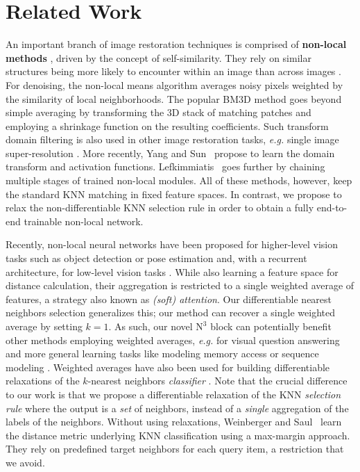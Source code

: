 \documentclass{article}
\makeatletter
\newcommand{\eg}{\emph{e.\thinspace{}g.}\@\xspace}
\newcommand\kk{k}
\newcommand\nnn{\text{N}^3}
\makeatother
\begin{document}
\section{Related Work}
An important branch of image restoration techniques is comprised of \textbf{non-local methods} \cite{Buades:2005:NLA,Dabov:2006:IDB,Lotan:2016:NMR,Zontak:2013:SSN}, driven by the concept of self-similarity.
They rely on similar structures being more likely to encounter within an image than across images \cite{Zontak:2011:ISS}.
For denoising, the non-local means algorithm \cite{Buades:2005:NLA} averages noisy pixels weighted by the similarity of
local neighborhoods.
The popular BM3D method \cite{Dabov:2006:IDB} goes beyond simple averaging by transforming the 3D stack of matching patches and employing a shrinkage function on the resulting coefficients. 
Such transform domain filtering is also used in other image restoration tasks, \eg single image super-resolution \cite{Cruz:2018:SIS}.
More recently, Yang and Sun~\cite{Yang:2018:BM3D} propose to learn the domain transform and activation functions.
Lefkimmiatis~\cite{Lefkimmiatis:2017:NLC,Lefkimmiatis:2018:UDN} goes further by chaining multiple stages of trained non-local modules.
All of these methods, however, keep the standard KNN matching in fixed feature spaces. 
In contrast, we propose to relax the non-differentiable KNN selection rule in order to obtain a fully end-to-end trainable non-local network.



Recently, non-local neural networks have been proposed for higher-level vision tasks such as object detection or pose estimation \cite{Wang:2017:NLN} and, with a recurrent architecture, for low-level vision tasks \cite{Liu:2018:NLR}. 
While also learning a feature space for distance calculation, their aggregation is restricted to a single weighted average of features, a strategy also known as \emph{(soft) attention}. 
Our differentiable nearest neighbors selection generalizes this; our method can recover a single weighted average by setting $\kk{=}1$.
As such, our novel $\nnn$ block can potentially benefit other methods employing weighted averages, \eg for visual question answering \cite{Xu:2016:AA}
and more general learning tasks like 
modeling memory access \cite{Graves:2014:NTM} or sequence modeling \cite{Vaswani:2017:AIA}.
Weighted averages have also been used for building differentiable relaxations
of the $\kk$-nearest neighbors \emph{classifier} \cite{Goldberger:2005:NCA,Ren:2014:LCN,Vinyals:2016:MNF}. 
Note that the crucial difference to our work is that we propose a differentiable relaxation of the KNN \emph{selection rule} where the output is a \emph{set} of neighbors, instead of a \emph{single} aggregation of the labels of the neighbors.
Without using relaxations, Weinberger and Saul~\cite{Weinberger:2009:DML} learn the distance metric underlying KNN classification using a max-margin approach.
They rely on predefined target neighbors for each query item, a restriction that we avoid. 
\end{document}
